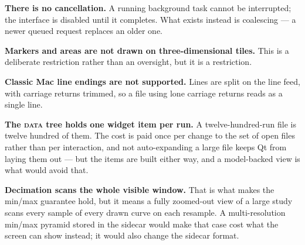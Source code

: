 \documentclass[11pt,a4paper,oneside]{report}
\newcommand{\tab}[1]{\textsc{#1}}
\begin{document}
\textbf{There is no cancellation.} A running background task cannot be
interrupted; the interface is disabled until it completes. What exists instead
is coalescing --- a newer queued request replaces an older one.

\textbf{Markers and areas are not drawn on three-dimensional tiles.} This is a
deliberate restriction rather than an oversight, but it is a restriction.

\textbf{Classic Mac line endings are not supported.} Lines are split on the line
feed, with carriage returns trimmed, so a file using lone carriage returns reads
as a single line.

\textbf{The \tab{data} tree holds one widget item per run.} A twelve-hundred-run
file is twelve hundred of them. The cost is paid once per change to the set of
open files rather than per interaction, and not auto-expanding a large file
keeps Qt from laying them out --- but the items are built either way, and a
model-backed view is what would avoid that.

\textbf{Decimation scans the whole visible window.} That is what makes the
min/max guarantee hold, but it means a fully zoomed-out view of a large study
scans every sample of every drawn curve on each resample. A multi-resolution
min/max pyramid stored in the sidecar would make that case cost what the screen
can show instead; it would also change the sidecar format.
\end{document}
